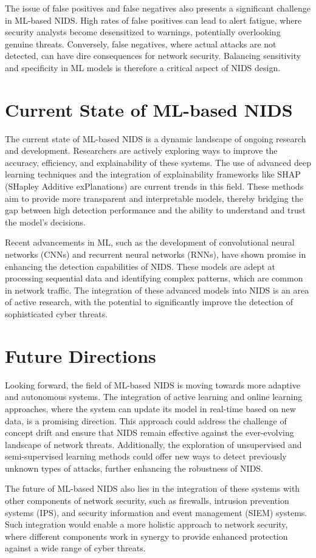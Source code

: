 The issue of false positives and false negatives also presents a significant challenge in ML-based NIDS. High rates of false positives can lead to alert fatigue, where security analysts become desensitized to warnings, potentially overlooking genuine threats. Conversely, false negatives, where actual attacks are not detected, can have dire consequences for network security. Balancing sensitivity and specificity in ML models is therefore a critical aspect of NIDS design.

\section{Current State of ML-based NIDS}
The current state of ML-based NIDS is a dynamic landscape of ongoing research and development. Researchers are actively exploring ways to improve the accuracy, efficiency, and explainability of these systems. The use of advanced deep learning techniques and the integration of explainability frameworks like SHAP (SHapley Additive exPlanations) are current trends in this field. These methods aim to provide more transparent and interpretable models, thereby bridging the gap between high detection performance and the ability to understand and trust the model's decisions.

Recent advancements in ML, such as the development of convolutional neural networks (CNNs) and recurrent neural networks (RNNs), have shown promise in enhancing the detection capabilities of NIDS. These models are adept at processing sequential data and identifying complex patterns, which are common in network traffic. The integration of these advanced models into NIDS is an area of active research, with the potential to significantly improve the detection of sophisticated cyber threats.

\section{Future Directions}
Looking forward, the field of ML-based NIDS is moving towards more adaptive and autonomous systems. The integration of active learning and online learning approaches, where the system can update its model in real-time based on new data, is a promising direction. This approach could address the challenge of concept drift and ensure that NIDS remain effective against the ever-evolving landscape of network threats. Additionally, the exploration of unsupervised and semi-supervised learning methods could offer new ways to detect previously unknown types of attacks, further enhancing the robustness of NIDS.

The future of ML-based NIDS also lies in the integration of these systems with other components of network security, such as firewalls, intrusion prevention systems (IPS), and security information and event management (SIEM) systems. Such integration would enable a more holistic approach to network security, where different components work in synergy to provide enhanced protection against a wide range of cyber threats.